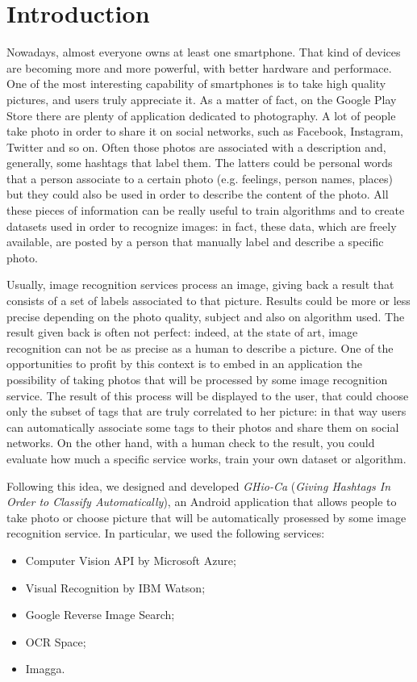 \section{Introduction}
\label{sec:introduction}

Nowadays, almost everyone owns at least one smartphone. That kind of devices are becoming more and more powerful, with better hardware and performace. One of the most interesting capability of smartphones is to take high quality pictures, and users truly appreciate it. As a matter of fact, on the Google Play Store there are plenty of application dedicated to photography.
A lot of people take photo in order to share it on social networks, such as Facebook, Instagram, Twitter and so on. Often those photos are associated with a description and, generally, some hashtags that label them. The latters could be personal words that a person associate to a certain photo (e.g. feelings, person names, places) but they could also be used in order to describe the content of the photo.
All these pieces of information can be really useful to train algorithms and to create datasets used in order to recognize images: in fact, these data, which are freely available, are posted by a person that manually label and describe a specific photo.

Usually, image recognition services process an image, giving back a result that consists of a set of labels associated to that picture. Results could be more or less precise depending on the photo quality, subject and also on algorithm used. The result given back is often not perfect: indeed, at the state of art, image recognition can not be as precise as a human to describe a picture.
One of the opportunities to profit by this context is to embed in an application the possibility of taking photos that will be processed by some image recognition service. The result of this process will be displayed to the user, that could choose only the subset of tags that are truly correlated to her picture: in that way users can automatically associate some tags to their photos and share them on
social networks. On the other hand, with a human check to the result, you could evaluate how much a specific service works, train your own dataset or algorithm. 

Following this idea, we designed and developed \textit{GHio-Ca} (\textit{Giving Hashtags In Order to Classify Automatically}), an Android application that allows people to take photo or choose picture that will be automatically prosessed by some image recognition service. In particular, we used the following services:
\begin{itemize}
	\item Computer Vision API by Microsoft Azure\cite{Microsoft};
	\item Visual Recognition by IBM Watson\cite{IBM};
	\item Google Reverse Image Search\cite{Google};
	\item OCR Space\cite{OCR};
	\item Imagga\cite{Imagga}.
\end{itemize}

